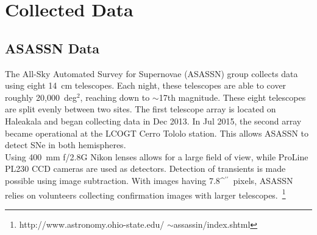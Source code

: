 \documentclass[aps,prb,twocolumn,superscriptaddress]{revtex4-1}
\def\arcsec{\ifmmode^{\prime\prime}\else$^{\prime\prime}$\fi}
\begin{document}
\section{Collected Data}

\subsection{ASASSN Data}

\indent The All-Sky Automated Survey for Supernovae (ASASSN) group 
collects data using eight 14~cm telescopes. Each night, these  
telescopes are able to cover roughly 20,000~deg$^2$, reaching 
down to $\sim$17th magnitude.  
These eight telescopes are split evenly between two sites.  
The first telescope array is located on Haleakala and began 
collecting data in Dec 2013. In Jul 2015, the second %
array became operational at the LCOGT Cerro Tololo station.  
This allows ASASSN to detect SNe in both 
hemispheres.~\cite{asn_data}\\
\indent Using 400~mm f/2.8G Nikon lenses allows for a large field of 
view, while ProLine PL230 CCD cameras are used as detectors. Detection of 
transients is made possible using image subtraction. With images 
having 7.8\arcsec\ pixels, ASASSN relies on volunteers collecting  
confirmation images with larger 
telescopes.~\footnote{\label{foot:asn} http://www.astronomy.ohio-state.edu/ $\sim$assassin/index.shtml}
\end{document}
